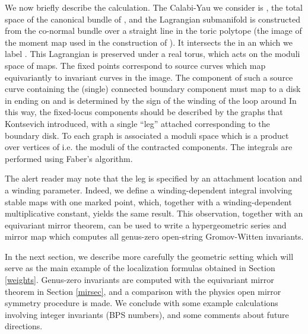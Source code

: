 \documentclass[a4paper,11pt]{article}
\providecommand{\PP}{{\mathbb{P}}}
\begin{document}
We now briefly describe the calculation.  The
Calabi-Yau we consider is \myHighlight{$K_{\PP^2}$}\coordHE{}, the
total space of the canonical bundle of \myHighlight{$\PP^2$}\coordHE{},
and the Lagrangian submanifold \coordHE{} is constructed from the
co-normal bundle over a straight line in the toric
polytope (the image of the
moment map used in the construction of \myHighlight{$K_{\PP^2}$}\coordHE{}).  It intersects
the \myHighlight{$\PP^2$}\coordHE{} in an \coordHE{} which we label \coordHE{}.
This Lagrangian is preserved under a real torus, which
acts on the moduli space of maps.
The fixed points correspond to
source curves which
map equivariantly to invariant curves in the image.
The component of such
a source curve containing the
(single) connected boundary component must map to
a disk in \myHighlight{$\PP^2$}\coordHE{} ending on \coordHE{} and is determined by the
sign of the winding of the loop around \coordHE{} 
In this way, the fixed-locus components should be described by
the graphs that Kontsevich introduced, with a single ``leg''
attached corresponding to the boundary disk.
To each graph \myHighlight{$\Gamma$}\coordHE{}
is associated a moduli space \coordHE{}
which is a product over vertices \coordHE{} of
\coordHE{}
i.e. the moduli of the contracted components.
The integrals are performed using Faber's algorithm.

The alert reader may note that the leg is specified
by an attachment location and a winding parameter.
Indeed, we define a winding-dependent integral involving
stable maps with one marked point, which, together
with a winding-dependent multiplicative constant,
yields the same result.  This observation, together
with an equivariant mirror theorem, can be
used to write a hypergeometric series and mirror map
which computes all genus-zero open-string Gromov-Witten
invariants.

\vskip0.2in
In the next section, we describe more carefully the
geometric setting
which will serve
as the main example of the localization
formulas obtained in Section \ref{weights}.
Genus-zero invariants are computed with the equivariant
mirror theorem in Section \ref{mirsec}, and a comparison with
the physics open mirror symmetry procedure is made.
We conclude with some example calculations involving
integer invariants (BPS numbers),
and some comments about future directions.
\end{document}
